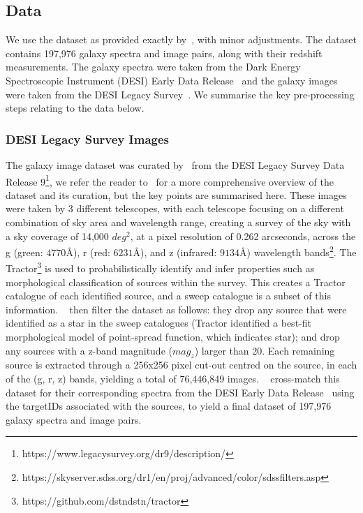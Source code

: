 \subsection{Data}\label{subsec:data}
We use the dataset as provided exactly by~\cite{astroclip}, with minor adjustments.
The dataset contains 197,976 galaxy spectra and image pairs, along with their redshift measurements.
The galaxy spectra were taken from the Dark Energy Spectroscopic Instrument (DESI) Early Data Release~\citep{desiearly2023}
and the galaxy images were taken from the DESI Legacy Survey~\citep{desilegacy2018}.
We summarise the key pre-processing steps relating to the data below.

\subsubsection{DESI Legacy Survey Images}\label{subsubsec:images}
The galaxy image dataset was curated by~\cite{stein2022} from the DESI Legacy Survey Data Release 9\footnote{https://www.legacysurvey.org/dr9/description/},
we refer the reader to~\cite{stein2022, astroclip} for a more comprehensive overview of the dataset and its curation, but the
key points are summarised here.
These images were taken by 3 different telescopes, with each telescope focusing on a different combination of sky area
and wavelength range, creating a survey of the sky with a sky coverage of 14,000 $deg^{2}$, at a pixel resolution of 0.262 arcseconds,
across the g (green: $4770 \si{\angstrom}$), r (red: $6231 \si{\angstrom}$), and z (infrared: $9134 \si{\angstrom}$) wavelength
bands\footnote{https://skyserver.sdss.org/dr1/en/proj/advanced/color/sdssfilters.asp}.
The Tractor\footnote{https://github.com/dstndstn/tractor} is used to probabilistically identify and infer properties such
as morphological classification of sources within the survey.
This creates a Tractor catalogue of each identified source, and a sweep catalogue is a subset of this information.
~\cite{stein2022} then filter the dataset as follows: they drop any source that were identified as a star in the sweep catalogues
(Tractor identified a best-fit morphological model of point-spread function, which indicates star); and drop any sources
with a z-band magnitude ($mag_{z}$) larger than 20.
Each remaining source is extracted through a 256x256 pixel cut-out centred on the source, in each of the (g, r, z) bands,
yielding a total of 76,446,849 images.
~\cite{astroclip} cross-match this dataset for their corresponding spectra from the DESI Early Data Release~\citep{desiearly2023}
using the targetIDs associated with the sources, to yield a final dataset of 197,976 galaxy spectra and image pairs.


